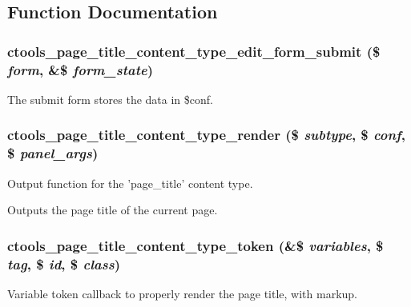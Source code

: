 \subsection{Function Documentation}
\hypertarget{page__title_8inc_a85666e0116e4aef569a498dd6c3fafad}{
\subsubsection[{ctools\_\-page\_\-title\_\-content\_\-type\_\-edit\_\-form\_\-submit}]{\setlength{\rightskip}{0pt plus 5cm}ctools\_\-page\_\-title\_\-content\_\-type\_\-edit\_\-form\_\-submit (\$ {\em form}, \/  \&\$ {\em form\_\-state})}}
\label{page__title_8inc_a85666e0116e4aef569a498dd6c3fafad}
The submit form stores the data in \$conf. \hypertarget{page__title_8inc_acaa253005e6582abb1efa33d16d459c7}{
\subsubsection[{ctools\_\-page\_\-title\_\-content\_\-type\_\-render}]{\setlength{\rightskip}{0pt plus 5cm}ctools\_\-page\_\-title\_\-content\_\-type\_\-render (\$ {\em subtype}, \/  \$ {\em conf}, \/  \$ {\em panel\_\-args})}}
\label{page__title_8inc_acaa253005e6582abb1efa33d16d459c7}
Output function for the 'page\_\-title' content type.

Outputs the page title of the current page. \hypertarget{page__title_8inc_a277e72debf66e71329b1f9960854822a}{
\subsubsection[{ctools\_\-page\_\-title\_\-content\_\-type\_\-token}]{\setlength{\rightskip}{0pt plus 5cm}ctools\_\-page\_\-title\_\-content\_\-type\_\-token (\&\$ {\em variables}, \/  \$ {\em tag}, \/  \$ {\em id}, \/  \$ {\em class})}}
\label{page__title_8inc_a277e72debf66e71329b1f9960854822a}
Variable token callback to properly render the page title, with markup. 


